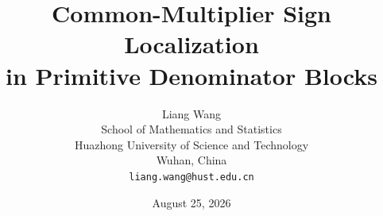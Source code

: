 \documentclass[11pt]{article}
\title{Common-Multiplier Sign Localization\\
in Primitive Denominator Blocks}
\author{Liang Wang\\
School of Mathematics and Statistics\\
Huazhong University of Science and Technology\\
Wuhan, China\\
\texttt{liang.wang@hust.edu.cn}}
\date{August 25, 2026}
\theoremstyle{remark}
\begin{document}
\maketitle

\begin{abstract}

\end{abstract}










\appendix

\end{document}
